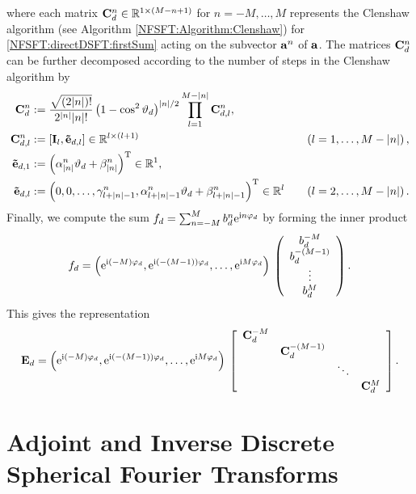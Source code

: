 where each matrix $\mathbf{C}^{n}_{d} \in \mathbb{R}^{1 \times (M-n+1)}$ for $n = -M,\ldots,M$ represents the Clenshaw algorithm 
(see Algorithm \ref{NFSFT:Algorithm:Clenshaw}) for \eqref{NFSFT:directDSFT:firstSum} acting on the subvector $\mathbf{a}^n$ of $\mathbf{a}$.
The matrices $\mathbf{C}_{d}^n$ can be further decomposed according to the number of steps in the Clenshaw algorithm by
\begin{align*}
  \mathbf{C}^{n}_{d}       
  & := \frac{\sqrt{(2|n|)!}}{2^{|n|} |n|!} 
       \left(1-\cos^2\vartheta_{d}\right)^{|n|/2}
       \prod_{l=1}^{M-|n|} \mathbf{C}_{d,l}^{n},\\
  \mathbf{C}_{d,l}^{n}     
  & := \left[\mathbf{I}_{l}, \mathbf{\tilde{e}}_{d,l}\right] \in \mathbb{R}^{l \times (l+1)} 
  & \quad \left(l=1,\ldots,M-|n|\right),\\
  \mathbf{\tilde{e}}_{d,1} 
  & := \left(\alpha_{|n|}^n \vartheta_{d} + \beta_{|n|}^n\right)^{\text{\rm{T}}} 
       \in \mathbb{R}^{1},\\
  \mathbf{\tilde{e}}_{d,l} 
  & := \left(0,0,\ldots,\gamma_{l+|n|-1}^n,\alpha_{l+|n|-1}^n 
       \vartheta_{d} + \beta_{l+|n|-1}^n\right)^{\text{\rm{T}}} \in \mathbb{R}^{l} 
  & \quad \left(l=2,\ldots,M-\left\vert n\right\vert\right).
\end{align*}
Finally, we compute the sum
$%
  f_{d} = \sum_{n=-M}^M b^{n}_{d} \e^{\im n \vphi_{d}}
$ %
by forming the inner product
\[
  f_{d} 
  = 
  \left(\mbox{\rm{e}}^{\mbox{\scriptsize\rm{i}} (-M) \varphi_{d}},\mbox{\rm{e}}^{\mbox{\scriptsize\rm{i}} (-(M-1)) \varphi_{d}},\ldots,\mbox{\rm{e}}^{\mbox{\scriptsize\rm{i}} M \varphi_{d}}\right)
  \:   
  \left(\begin{array}{c}
    b^{-M}_{d}\\
    b^{-(M-1)}_{d}\\
    \vdots\\
    b^{M}_{d}
  \end{array}\right).
\]
This gives the representation
\[
  \mathbf{E}_{d} = \left(\mbox{\rm{e}}^{\mbox{\scriptsize\rm{i}} (-M) \varphi_{d}},\mbox{\rm{e}}^{\mbox{\scriptsize\rm{i}} (-(M-1)) \varphi_{d}},\ldots,\mbox{\rm{e}}^{\mbox{\scriptsize\rm{i}} M \varphi_{d}}\right) \:  
  \left[\begin{array}{cccc}
    \mathbf{C}^{-M}_{d} &                    &        &               \\
                   & \mathbf{C}^{-(M-1)}_{d} &        &               \\
                   &                    & \ddots &               \\
                   &                    &        & \mathbf{C}^{M}_{d} 
  \end{array}\right].
\]

\section{Adjoint and Inverse Discrete Spherical Fourier Transforms}

